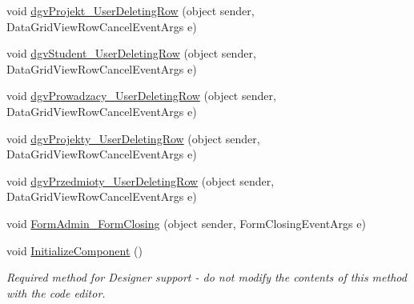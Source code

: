 \begin{DoxyCompactItemize}
\item 
void \hyperlink{class_dziennik_ocen_1_1_form_admin_ad25ef9fe40bb0f7d995b07c10e053c3d}{dgv\+Projekt\+\_\+\+User\+Deleting\+Row} (object sender, Data\+Grid\+View\+Row\+Cancel\+Event\+Args e)
\item 
void \hyperlink{class_dziennik_ocen_1_1_form_admin_af3ef7cac8cbb4acf92efdd1c3d278647}{dgv\+Student\+\_\+\+User\+Deleting\+Row} (object sender, Data\+Grid\+View\+Row\+Cancel\+Event\+Args e)
\item 
void \hyperlink{class_dziennik_ocen_1_1_form_admin_aaf3a81a886da60aae87a34b5ca2e3d4d}{dgv\+Prowadzacy\+\_\+\+User\+Deleting\+Row} (object sender, Data\+Grid\+View\+Row\+Cancel\+Event\+Args e)
\item 
void \hyperlink{class_dziennik_ocen_1_1_form_admin_a48466d6cfac9af36f0a581af601f7906}{dgv\+Projekty\+\_\+\+User\+Deleting\+Row} (object sender, Data\+Grid\+View\+Row\+Cancel\+Event\+Args e)
\item 
void \hyperlink{class_dziennik_ocen_1_1_form_admin_a3e68e6b9a8298d9e207cb0aba20b161b}{dgv\+Przedmioty\+\_\+\+User\+Deleting\+Row} (object sender, Data\+Grid\+View\+Row\+Cancel\+Event\+Args e)
\item 
void \hyperlink{class_dziennik_ocen_1_1_form_admin_a751a9f0c3a418edabd1f6ce4d78d4ceb}{Form\+Admin\+\_\+\+Form\+Closing} (object sender, Form\+Closing\+Event\+Args e)
\item 
void \hyperlink{class_dziennik_ocen_1_1_form_admin_a876a136e8c48ca102cc44b34c5993c43}{Initialize\+Component} ()
\begin{DoxyCompactList}\small\item\em Required method for Designer support -\/ do not modify the contents of this method with the code editor. \end{DoxyCompactList}\end{DoxyCompactItemize}
